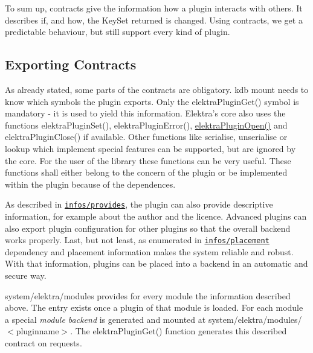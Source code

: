 To sum up, contracts give the information how a plugin interacts with others. It describes if, and how, the {\ttfamily Key\+Set} {\ttfamily returned} is changed. Using contracts, we get a predictable behaviour, but still support every kind of plugin.

\subsection*{Exporting Contracts}

As already stated, some parts of the contracts are obligatory. {\ttfamily kdb mount} needs to know which symbols the plugin exports. Only the {\ttfamily elektra\+Plugin\+Get()} symbol is mandatory -\/ it is used to yield this information. Elektra's core also uses the functions {\ttfamily elektra\+Plugin\+Set()}, {\ttfamily elektra\+Plugin\+Error()}, {\ttfamily \hyperlink{elektra_2plugin_8c_a32a70a7876542c51d153164ac5108a57}{elektra\+Plugin\+Open()}} and {\ttfamily elektra\+Plugin\+Close()} if available. Other functions like {\ttfamily serialise}, {\ttfamily unserialise} or {\ttfamily lookup} which implement special features can be supported, but are ignored by the core. For the user of the library these functions can be very useful. These functions shall either belong to the concern of the plugin or be implemented within the plugin because of the dependences.

As described in \href{/home/markus/Projekte/Elektra/current/doc/CONTRACT.ini}{\tt infos/provides}, the plugin can also provide descriptive information, for example about the author and the licence. Advanced plugins can also export plugin configuration for other plugins so that the overall backend works properly. Last, but not least, as enumerated in \href{/home/markus/Projekte/Elektra/current/doc/CONTRACT.ini}{\tt infos/placement} dependency and placement information makes the system reliable and robust. With that information, plugins can be placed into a backend in an automatic and secure way.

{\ttfamily system/elektra/modules} provides for every module the information described above. The entry exists once a plugin of that module is loaded. For each module a special {\itshape module backend} is generated and mounted at {\ttfamily system/elektra/modules/$<$pluginname$>$}. The {\ttfamily elektra\+Plugin\+Get()} function generates this described contract on requests.


